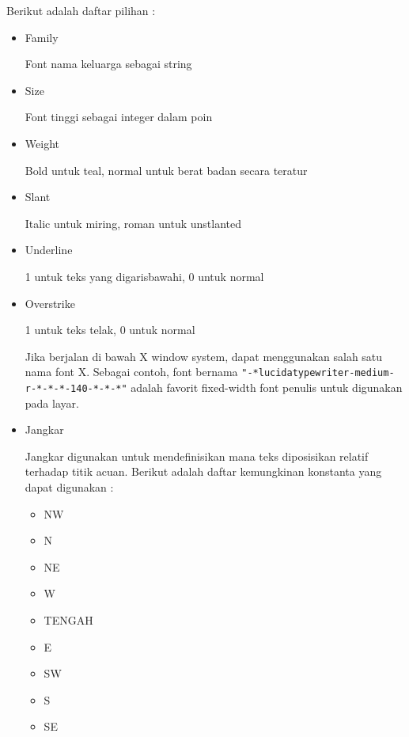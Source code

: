 \vspace{12pt}
Berikut adalah daftar pilihan : 
 
\begin{itemize}

	\item Family \par
	Font nama keluarga sebagai string \par
	\noindent 
	\item Size \par
	Font tinggi sebagai integer dalam poin \par
	\noindent 
	\item Weight \par
	Bold untuk teal, normal untuk berat badan secara teratur \par
	\noindent 
	\item Slant \par
	Italic untuk miring, roman untuk unstlanted \par
	\noindent 
	\item Underline \par
	1 untuk teks yang digarisbawahi, 0 untuk normal \par
	\noindent 
	\item Overstrike \par
	1 untuk teks telak, 0 untuk normal \par
	Jika berjalan di bawah X window system, dapat menggunakan salah satu nama font X. Sebagai contoh, font bernama  \verb|"-*lucidatypewriter-medium-r-*-*-*-140-*-*-*"| adalah favorit fixed-width font penulis untuk digunakan pada layar. \par
	\noindent 
	\item Jangkar \par
	\noindent 
	Jangkar digunakan untuk mendefinisikan mana teks diposisikan relatif terhadap titik acuan. Berikut adalah daftar kemungkinan konstanta yang dapat digunakan :
	\noindent
	\begin{itemize}
		\item NW  
		\item N
		\item NE
		\item W
		\item TENGAH
		\item E
		\item SW
		\item S
		\item SE
	\end{itemize}
\end{itemize}
